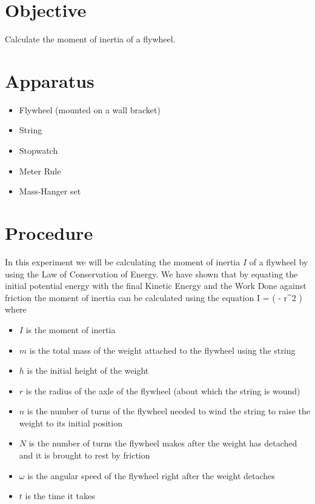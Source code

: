 \section{Objective}

    Calculate the moment of inertia of a flywheel.

\section{Apparatus}

    \begin{itemize}

        \item Flywheel (mounted on a wall bracket)
        \item String
        \item Stopwatch
        \item Meter Rule
        \item Mass-Hanger set

    \end{itemize}

\section{Procedure}

    In this experiment we will be calculating the moment of inertia $I$ of a flywheel by using the Law of Conservation of Energy. We have shown that by equating the initial potential energy with the final Kinetic Energy and the Work Done against friction the moment of inertia can be calculated using the equation
    \beq \label{I}
        I =  \left(  - r^2 \right)
    \eeq
    where
    \begin{itemize}

        \item $I$ is the moment of inertia
        \item $m$ is the total mass of the weight attached to the flywheel using the string
        \item $h$ is the initial height of the weight
        \item $r$ is the radius of the axle of the flywheel (about which the string is wound)
        \item $n$ is the number of turns of the flywheel needed to wind the string to raise the weight to its initial position
        \item $N$ is the number of turns the flywheel makes after the weight has detached and it is brought to rest by friction
        \item $\omega$ is the angular speed of the flywheel right after the weight detaches
        \item $t$ is the time it takes

    \end{itemize}

